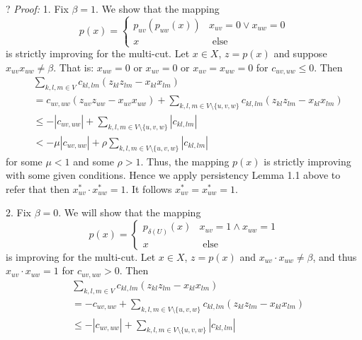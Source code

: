  ? 
\textit{Proof:} 1. Fix $\beta=1$. We show that the mapping \[ p(x) = \begin{cases} 
p_{uv}(p_{uw}(x)) & x_{uv}=0 \lor x_{uw}=0 \\
x & \text{ else }
\end{cases} \] is strictly improving for the multi-cut. Let $x \in X$, $z=p(x)$ and suppose $x_{uv}x_{uw} \neq \beta$. That is: $x_{uw}=0$  or $x_{uv}=0$ or $x_{uv}=x_{uw}=0$ for $c_{uv,uw} \leq 0$. 
Then \begin{equation}
\begin{split}
    &\sum_{k,l,m \in V} c_{kl,lm} (z_{kl} z_{lm} - x_{kl} x_{lm} ) \\
    & = c_{uv,uw}(z_{uv}z_{uw}-x_{uv}x_{uw}) + \sum_{k,l,m \in V \setminus \{u,v,w\}} c_{kl,lm} (z_{kl} z_{lm} - x_{kl} x_{lm} ) \\
    & \leq - |c_{uv,uw}| + \sum_{k,l,m \in V \setminus \{u,v,w\} }  |c_{kl,lm}| \\
    & < - \mu |c_{uv,uw}| + \rho \sum_{k,l,m \in V \setminus \{u,v,w\} }  |c_{kl,lm}| 
\end{split}
\end{equation}
for some $\mu <1$ and some $\rho >1$. 
Thus, the mapping $p(x)$ is strictly improving with some given conditions. Hence we apply persistency Lemma 1.1 above to refer that then $x^*_{uv} \cdot x^*_{uw}=1$. It follows $x^*_{uv}=x^*_{uw}=1$.

2. Fix $\beta=0$. We will show that the mapping \[ p(x) = \begin{cases}
p_{\delta(U)}(x) & x_{uv}=1 \land x_{uw}=1 \\
x & \text{ else }
\end{cases} \] is improving for the multi-cut. Let $x \in X$, $z=p(x)$ and $x_{uv} \cdot x_{uw} \neq \beta$, and thus $x_{uv} \cdot x_{uw}=1$ for $c_{uv,uw}>0$. 
Then \begin{equation}
\begin{split}
    &\sum_{k,l,m \in V} c_{kl,lm} (z_{kl} z_{lm} - x_{kl} x_{lm} ) \\
    & = -c_{uv,uw} + \sum_{k,l,m \in V \setminus \{u,v,w\}} c_{kl,lm} (z_{kl} z_{lm} - x_{kl} x_{lm} ) \\
    & \leq - |c_{uv,uw}| + \sum_{k,l,m \in V \setminus \{u,v,w\} }  |c_{kl,lm}| 
\end{split}
\end{equation}
 

